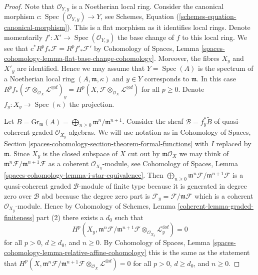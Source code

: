 \documentclass{stacks-project}
\theoremstyle{plain}
\theoremstyle{definition}
\theoremstyle{remark}
\numberwithin{equation}{subsection}
\def\Spec{\mathop{\mathrm{Spec}}}
\begin{document}
\begin{proof}
Note that $\mathcal{O}_{Y, y}$ is a Noetherian local ring.
Consider the canonical morphism
$c : \Spec(\mathcal{O}_{Y, y}) \to Y$, see
Schemes, Equation (\ref{schemes-equation-canonical-morphism}).
This is a flat morphism as it identifies local rings.
Denote momentarily $f' : X' \to \Spec(\mathcal{O}_{Y, y})$
the base change of $f$ to this local ring. We see that
$c^*R^pf_*\mathcal{F} = R^pf'_*\mathcal{F}'$ by
Cohomology of Spaces, Lemma
\ref{spaces-cohomology-lemma-flat-base-change-cohomology}.
Moreover, the fibres $X_y$ and $X'_y$ are identified.
Hence we may assume that $Y = \Spec(A)$ is the spectrum of
a Noetherian local ring $(A, \mathfrak m, \kappa)$ and $y \in Y$
corresponds to $\mathfrak m$. In this case
$R^pf_*(\mathcal{F} \otimes_{\mathcal{O}_X} \mathcal{L}^{\otimes d})_y =
H^p(X, \mathcal{F} \otimes_{\mathcal{O}_X} \mathcal{L}^{\otimes d})$
for all $p \geq 0$. Denote $f_y : X_y \to \Spec(\kappa)$ the projection.

\medskip\noindent
Let $B = \text{Gr}_\mathfrak m(A) =
\bigoplus_{n \geq 0} \mathfrak m^n/\mathfrak m^{n + 1}$.
Consider the sheaf $\mathcal{B} = f_y^*\widetilde{B}$
of quasi-coherent graded $\mathcal{O}_{X_y}$-algebras.
We will use notation as in Cohomology of Spaces, Section
\ref{spaces-cohomology-section-theorem-formal-functions}
with $I$ replaced by $\mathfrak m$.
Since $X_y$ is the closed subspace of $X$ cut out by
$\mathfrak m\mathcal{O}_X$ we may think of
$\mathfrak m^n\mathcal{F}/\mathfrak m^{n + 1}\mathcal{F}$
as a coherent $\mathcal{O}_{X_y}$-module, see
Cohomology of Spaces, Lemma \ref{spaces-cohomology-lemma-i-star-equivalence}.
Then
$\bigoplus_{n \geq 0} \mathfrak m^n\mathcal{F}/\mathfrak m^{n + 1}\mathcal{F}$
is a quasi-coherent graded $\mathcal{B}$-module of finite type
because it is generated in degree zero over $\mathcal{B}$
abd because the degree zero part is
$\mathcal{F}_y = \mathcal{F}/\mathfrak m \mathcal{F}$
which is a coherent $\mathcal{O}_{X_y}$-module.
Hence by Cohomology of Schemes, Lemma
\ref{coherent-lemma-graded-finiteness} part (2)
there exists a $d_0$ such that
$$
H^p(X_y, \mathfrak m^n \mathcal{F}/ \mathfrak m^{n + 1}\mathcal{F}
\otimes_{\mathcal{O}_{X_y}} \mathcal{L}_y^{\otimes d}) = 0
$$
for all $p > 0$, $d \geq d_0$, and $n \geq 0$. By
Cohomology of Spaces, Lemma
\ref{spaces-cohomology-lemma-relative-affine-cohomology}
this is the same as the statement that
$
H^p(X, \mathfrak m^n \mathcal{F}/ \mathfrak m^{n + 1}\mathcal{F}
\otimes_{\mathcal{O}_X} \mathcal{L}^{\otimes d}) = 0
$
for all $p > 0$, $d \geq d_0$, and $n \geq 0$.


\end{proof}
\end{document}
